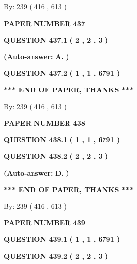 \documentclass[12pt]{article}
\begin{document}
   
\hspace{1.0in} By: 
 239 ( 416 ,  613 )
   
   
   
   
\newpage 
\setcounter{page}{ 
   437001 } 
   
   
 {\textbf{ \Large{ PAPER NUMBER  437  }}}
   
   
   
   
  
  
{\textbf{\large{QUESTION
437.1 
 ( 2 , 2 , 3 )
}}}
 
 
{\textbf{(Auto-answer:}}
{\textbf{\large{
A.}}}
{\textbf{)}}
 
 
  
  
{\textbf{\large{QUESTION
437.2 
 ( 1 , 1 , 6791 )
}}}
   
   
   
   
\vspace{1.0in} 
{\textbf{\large{ *** END OF PAPER, THANKS *** }}} 
   
   
\hspace{1.0in} By: 
 239 ( 416 ,  613 )
   
   
   
   
\newpage 
\setcounter{page}{ 
   438001 } 
   
   
 {\textbf{ \Large{ PAPER NUMBER  438  }}}
   
   
   
   
  
  
{\textbf{\large{QUESTION
438.1 
 ( 1 , 1 , 6791 )
}}}
  
  
{\textbf{\large{QUESTION
438.2 
 ( 2 , 2 , 3 )
}}}
 
 
{\textbf{(Auto-answer:}}
{\textbf{\large{
D.}}}
{\textbf{)}}
 
 
   
   
   
   
\vspace{1.0in} 
{\textbf{\large{ *** END OF PAPER, THANKS *** }}} 
   
   
\hspace{1.0in} By: 
 239 ( 416 ,  613 )
   
   
   
   
\newpage 
\setcounter{page}{ 
   439001 } 
   
   
 {\textbf{ \Large{ PAPER NUMBER  439  }}}
   
   
   
   
  
  
{\textbf{\large{QUESTION
439.1 
 ( 1 , 1 , 6791 )
}}}
  
  
{\textbf{\large{QUESTION
439.2 
 ( 2 , 2 , 3 )
}}}
 
\end{document}
